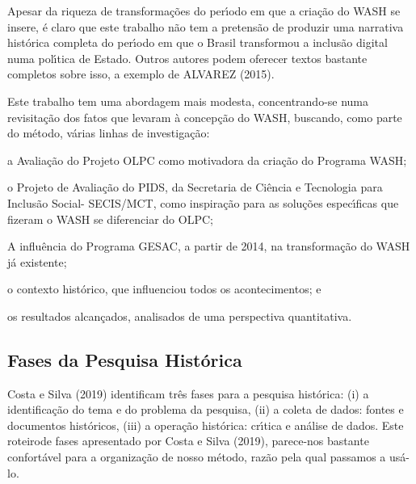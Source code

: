 \documentclass[
12pt,		%
openright,	%
twoside,  %
a4paper,			%
chapter=TITLE,		%
english,			%
french,				%
spanish,			%
brazil				%
]{USPSC-classe/USPSC}
\begin{document}
Apesar da riqueza de transforma\c{c}\~oes do per\'{\i}odo em que a cria\c{c}\~ao do WASH se insere, \'e claro que este trabalho n\~ao tem a pretens\~ao de produzir uma narrativa hist\'orica completa do per\'{\i}odo em que o Brasil transformou a inclus\~ao digital numa pol\'{\i}tica de Estado. Outros autores podem oferecer textos bastante completos sobre isso, a exemplo de  ALVAREZ (2015).

















Este trabalho tem uma abordagem mais modesta, concentrando-se numa revisita\c{c}\~ao dos fatos que levaram \`a concep\c{c}\~ao do WASH, buscando, como parte do m\'etodo, v\'arias linhas de investiga\c{c}\~ao:


















\begin{alineas}
\item a Avalia\c{c}\~ao do Projeto OLPC como motivadora da cria\c{c}\~ao do Programa WASH;
\item o Projeto de Avalia\c{c}\~ao do PIDS, da Secretaria de Ci\^encia e Tecnologia para Inclus\~ao Social- SECIS/MCT, como inspira\c{c}\~ao para as solu\c{c}\~oes espec\'{\i}ficas que fizeram o WASH se diferenciar do OLPC;
\item A influ\^encia do Programa GESAC, a partir de 2014, na transforma\c{c}\~ao do WASH j\'a existente;
\item o contexto hist\'orico, que influenciou todos os acontecimentos; e
\item os resultados alcan\c{c}ados, analisados de uma perspectiva quantitativa.
\end{alineas}

\subsection[Fases da Pesquisa Hist\'orica]{Fases da Pesquisa Hist\'orica}\label{Fases da Pesquisa Hist\'orica}
Costa e Silva (2019) identificam tr\^es fases para a pesquisa hist\'orica: (i) a identifica\c{c}\~ao do tema e do problema da pesquisa, (ii) a coleta de dados: fontes e documentos hist\'oricos, (iii) a opera\c{c}\~ao hist\'orica: cr\'{\i}tica e an\'alise de dados. Este \textquotedbl roteiro\textquotedbl  de fases apresentado por  Costa e Silva (2019), parece-nos bastante confort\'avel para a organiza\c{c}\~ao de nosso m\'etodo, raz\~ao pela qual passamos a us\'a-lo.
\end{document}
